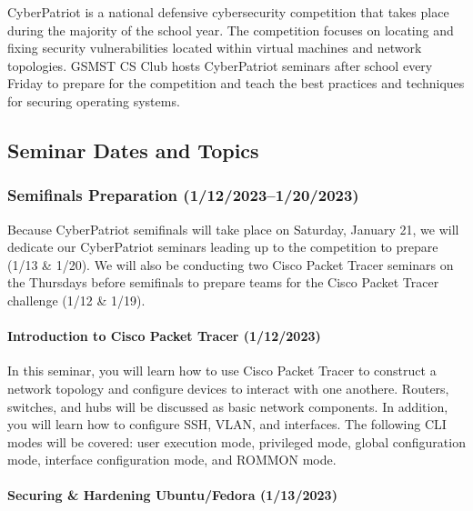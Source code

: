 \documentclass[
  letterpaper,
  DIV=11,
  numbers=noendperiod]{scrartcl}
\let\oldparagraph\paragraph
\renewcommand{\paragraph}[1]{\oldparagraph{#1}\mbox{}}
\begin{document}
CyberPatriot is a national defensive cybersecurity competition that
takes place during the majority of the school year. The competition
focuses on locating and fixing security vulnerabilities located within
virtual machines and network topologies. GSMST CS Club hosts
CyberPatriot seminars after school every Friday to prepare for the
competition and teach the best practices and techniques for securing
operating systems.

\hypertarget{seminar-dates-and-topics-1}{%
\subsection{Seminar Dates and Topics}\label{seminar-dates-and-topics-1}}

\hypertarget{semifinals-preparation-11220231202023}{%
\subsubsection{Semifinals Preparation
(1/12/2023--1/20/2023)}\label{semifinals-preparation-11220231202023}}

Because CyberPatriot semifinals will take place on Saturday, January 21,
we will dedicate our CyberPatriot seminars leading up to the competition
to prepare (1/13 \& 1/20). We will also be conducting two Cisco Packet
Tracer seminars on the Thursdays before semifinals to prepare teams for
the Cisco Packet Tracer challenge (1/12 \& 1/19).

\hypertarget{introduction-to-cisco-packet-tracer-1122023}{%
\paragraph{Introduction to Cisco Packet Tracer
(1/12/2023)}\label{introduction-to-cisco-packet-tracer-1122023}}

In this seminar, you will learn how to use Cisco Packet Tracer to
construct a network topology and configure devices to interact with one
anothere. Routers, switches, and hubs will be discussed as basic network
components. In addition, you will learn how to configure SSH, VLAN, and
interfaces. The following CLI modes will be covered: user execution
mode, privileged mode, global configuration mode, interface
configuration mode, and ROMMON mode.

\hypertarget{securing-harden-ubuntu-fedora}{%
\paragraph{Securing \& Hardening Ubuntu/Fedora
(1/13/2023)}\label{securing-harden-ubuntu-fedora}}
\end{document}
